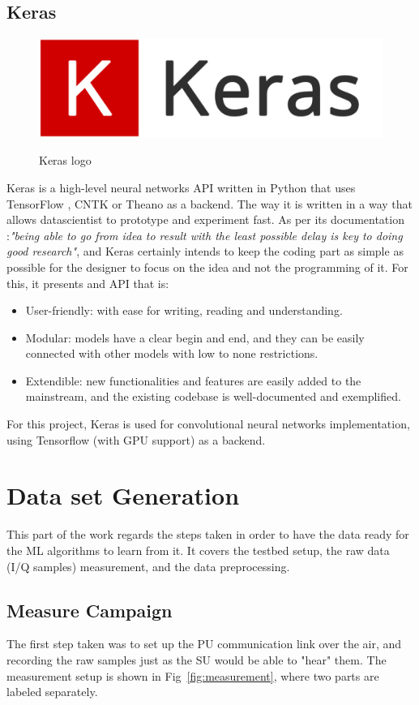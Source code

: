 \subsection{Keras}
\begin{figure}[!h]
    \centering
    \includegraphics[width=0.5\linewidth]{figures/keras_logo}
    \label{fig:keras_logo}
    \caption{Keras logo}
\end{figure}
Keras is a high-level neural networks API written in Python that uses TensorFlow \cite{TensorFlow}, CNTK \cite{CNTK} or Theano \cite{Theano} as a backend. The way it is written in a way that allows datascientist to prototype and experiment fast. As per its documentation \cite{KERAS}:\emph{"being able to go from idea to result with the least possible delay is key to doing good research"}, and Keras certainly intends to keep the coding part as simple as possible for the designer to focus on the idea and not the programming of it. For this, it presents and API that is:

\begin{itemize}
    \item User-friendly: with ease for writing, reading and understanding.
    \item Modular: models have a clear begin and end, and they can be easily connected with other models with low to none restrictions.
    \item  Extendible: new functionalities and features are easily added to the mainstream, and the existing codebase is well-documented and exemplified.
\end{itemize}

For this project, Keras is used for convolutional neural networks implementation, using Tensorflow (with GPU support) as a backend.

\section{Data set Generation}
This part of the work regards the steps taken in order to have the data ready for the \ac{ML} algorithms to learn from it. It covers the testbed setup, the raw data (I/Q samples) measurement, and the data preprocessing.
\subsection{Measure Campaign}
The first step taken was to set up the \ac{PU} communication link over the air, and recording the raw samples just as the \ac{SU} would be able to "hear" them. The measurement setup is shown in Fig~\ref{fig:measurement}, where two parts are labeled separately.

